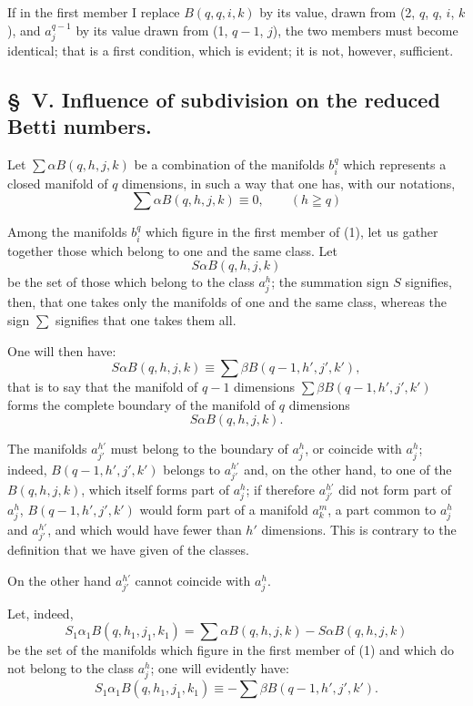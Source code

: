 \documentclass{article}
\begin{document}
If in the first member I replace $B(q, q, i, k)$ by its value, drawn from (2, $q$, $q$, $i$, $k$), and $a^{q-1}_{j}$ by its value drawn from (1, $q - 1$, $j$), the two members must become identical; that is a first condition, which is evident; it is not, however, sufficient.

\subsection*{\S~V. Influence of subdivision on the reduced Betti numbers.}

Let $\displaystyle\sum \alpha B(q, h, j, k)$ be a combination of the manifolds $b^{q}_{i}$ which represents a closed manifold of $q$ dimensions, in such a way that one
has, with our notations,
\[ \sum \alpha B(q, h, j, k) \equiv 0, \qquad (h \geqq q) \tag{1} \]

Among the manifolds $b^{q}_{i}$ which figure in the first member of (1), let us gather together those which belong to one and the same class. Let
\[ S \alpha B(q, h, j, k) \]
be the set of those which belong to the class $a^{h}_{j}$; the summation sign $S$ signifies, then, that one takes only the manifolds of one and the same class, whereas the sign $\displaystyle\sum$ signifies that one takes them all.

One will then have:
\[ S \alpha B(q, h, j, k) \equiv \sum \beta B(q - 1, h', j', k'), \tag{2} \]
that is to say that the manifold of $q - 1$ dimensions $\displaystyle\sum \beta B(q - 1, h', j', k')$ forms the complete boundary of the manifold of $q$ dimensions
\[ S \alpha B(q, h, j, k). \]

The manifolds $a^{h'}_{j'}$ must belong to the boundary of $a^{h}_{j}$, or coincide with $a^{h}_{j}$; indeed, $B(q - 1, h', j', k')$ belongs to $a^{h'}_{j'}$ and, on the other hand, to one of the $B(q, h, j, k)$, which itself forms part of $a^{h}_{j}$; if therefore $a^{h'}_{j'}$ did not form part of $a^{h}_{j}$, $B(q - 1, h', j', k')$ would form part of a manifold $a^{m}_{k}$, a part common to $a^{h}_{j}$ and $a^{h'}_{j'}$, and which would have fewer than $h'$ dimensions. This is contrary to the definition that we have given of the classes.

On the other hand $a^{h'}_{j'}$ cannot coincide with $a^{h}_{j}$.

Let, indeed,
\[ S_{1} \alpha_{1} B(q, h_{1}, j_{1}, k_{1}) = \sum \alpha B(q, h, j, k) - S \alpha B(q, h, j, k) \]
be the set of the manifolds which figure in the first member of (1) and which do not belong to the class $a^{h}_{j}$; one will evidently have:
\[ S_{1} \alpha_{1} B(q, h_{1}, j_{1}, k_{1}) \equiv - \sum \beta B(q - 1, h', j', k'). \]
\end{document}
